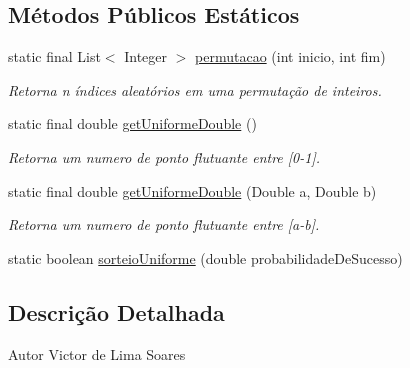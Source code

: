 \subsection*{Métodos Públicos Estáticos}
\begin{DoxyCompactItemize}
\item 
static final List$<$ Integer $>$ \hyperlink{classic_1_1populacional_1_1utilidades_1_1_aleatorios_ac9a7a3a713982bd9d998a72af9505bca}{permutacao} (int inicio, int fim)
\begin{DoxyCompactList}\small\item\em Retorna n índices aleatórios em uma permutação de inteiros. \end{DoxyCompactList}\item 
static final double \hyperlink{classic_1_1populacional_1_1utilidades_1_1_aleatorios_ade30e7f2fcb5a65542f45463a7920406}{get\-Uniforme\-Double} ()
\begin{DoxyCompactList}\small\item\em Retorna um numero de ponto flutuante entre \mbox{[}0-\/1\mbox{]}. \end{DoxyCompactList}\item 
static final double \hyperlink{classic_1_1populacional_1_1utilidades_1_1_aleatorios_a1f014264b956136dea38ce9e3ae8e6ba}{get\-Uniforme\-Double} (Double a, Double b)
\begin{DoxyCompactList}\small\item\em Retorna um numero de ponto flutuante entre \mbox{[}a-\/b\mbox{]}. \end{DoxyCompactList}\item 
static boolean \hyperlink{classic_1_1populacional_1_1utilidades_1_1_aleatorios_a92ad4ea348ed7dd0fd3e400f2389abe4}{sorteio\-Uniforme} (double probabilidade\-De\-Sucesso)
\end{DoxyCompactItemize}


\subsection{Descrição Detalhada}
\begin{DoxyAuthor}{Autor}
Victor de Lima Soares 
\end{DoxyAuthor}


